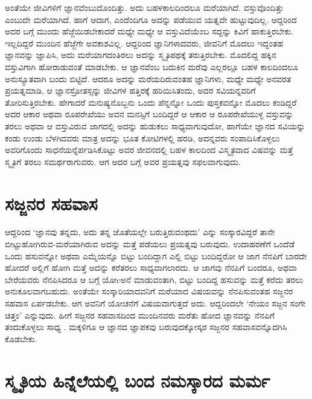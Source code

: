 ಅಂತೆಯೇ ಜೀವಿಗಳಿಗೆ ಜ್ಞಾನವೆಂಬುದೊಂದಿತ್ತು. ಅದು ಬಹಳಕಾಲದಿಂದಲೂ ಮರೆಯಾಗಿದೆ. ವಸ್ತುವೊಂದಿತ್ತು ಎಂಬುದೇ ಮರೆಯಾಗಿದೆ. ಹಾಗೆ ಆದಾಗ, ಎಂದೆಂದಿಗೂ ಅದನ್ನು ಪಡೆಯುವ ಯತ್ನವೇ ಹುಟ್ಟುವುದಿಲ್ಲ. ಆದ್ದರಿಂದ ಅದರ ಬಗ್ಗೆ ಮುಂದು ಹೆಜ್ಜೆಯಿಡಬೇಕಾದರೆ ಮಧ್ಯೇ ಮಧ್ಯೇ ಆ ವಸ್ತುವಿದೆಯೆಂಬ ಸದ್ದನ್ನು ಕಿವಿಗೆ ಹಾಕುತ್ತಿರಬೇಕು. ಇಲ್ಲದಿದ್ದರೆ ಮುಂದಿನ ಹೆಜ್ಜೆಗೇ ಅವಕಾಶವಿಲ್ಲ. ಆದ್ದರಿಂದ ಜ್ಞಾನಿಗಳಾದವರು, ಜೀವನಿಗೆ ಮೊದಲು ಇದ್ದಂತಹ ಜ್ಞಾನವನ್ನು ಜ್ಞಾಪಿಸಿ, ಅದು ಮರೆಯಾಗದಂತಿರಲು ಅದನ್ನು ಸ್ಮೃತಿಪಥಕ್ಕೆ ತರುತ್ತಿರಬೇಕು. ಮೊದಲಿದ್ದ ಹಕ್ಕಿನ ವಸ್ತುವಿಗಾಗಿ ಹೋರಾಡುವಂತೆ ಮಾಡಬೇಕು. ಆ ಜ್ಞಾನವೆಂಬ ಬದುಕಿನ ಮರೆವು ಎಲ್ಲರಲ್ಲೂ ಬಹಳ ಕಾಲದಿಂದಲೂ ಅನುಸ್ಯೂತವಾಗಿ ಬಂದು ಬಿಟ್ಟಿದೆ. ಆದರೂ ಅದನ್ನು ಮರೆಯದಿರುವಂತಹ ಜ್ಞಾನಿಗಳು, ಮಧ್ಯೇ ಮಧ್ಯೇ ಅನವರತ ಪ್ರಯತ್ನಮಾಡಿ, ಆ ಜ್ಞಾನಸ್ರೋತಸ್ಸನ್ನು ಜೀವಿಗಳ ಹತ್ತಿರಕ್ಕೆ ಹರಿಯಿಸಿತಂದು, ಅದರ ಸವಿಯನ್ನವರಿಗೆ ತೋರಿಸುತ್ತಿರಬೇಕು. ಹೇಗಾದರೆ ಮನುಷ್ಯನೊಬ್ಬನು ಒಂದು ಪೆನ್ನನ್ನೋ ಒಂದು ಪುಸ್ತಕವನ್ನೋ ಮೊದಲು ಕಂಡಿದ್ದರೆ ಅದರ ಆಕಾರ ಅಥವಾ ರೂಪರೇಖೆಯು ಅವನ ಮನಸ್ಸಿಗೆ ಬಂದಿದ್ದರೆ ಆ ಆಕಾರ ಆ ರೂಪರೇಖೆಯುಳ್ಳ ವಸ್ತುವನ್ನು ತರಲು ಅಥವಾ ಆ ವಸ್ತುವಿರುವ ಜಾಗದಲ್ಲಿ ಅದನ್ನು ಹುಡುಕಲು ಸಾಧ್ಯವಾಗುವುದೋ, ಹಾಗೆಯೇ ಜ್ಞಾನದ ಸವಿಯನ್ನು ಕಂಡು ಉಂಡು ಬೆಳಗಿದವರು ಮಾತ್ರ ಅದನ್ನು ಭೂತ ಕೋಟಿಗಳಲ್ಲಿ ಹರಡಿ, ಅದನ್ನವರು ಸಂಪಾದಿಸಿಕೊಳ್ಳಲು ಅವರಿಗೊಂದು ಸಾಧನೆಯನ್ನೆರ್ಪಡಿಸಿಕೊಟ್ಟು ಅವರ ಜೀವನದಲ್ಲಿ ಬಹಳ ಕಾಲದಿಂದ ವಿಸ್ಮೃತವಾದ ವಿಷವನ್ನು ಮತ್ತೆ ಸ್ಮೃತಿಗೆ ತರಲು ಸಮರ್ಥರಾಗುವರು. ಆಗ ಅದರ ಬಗ್ಗೆ ಅವರ ಪ್ರಯತ್ನವು ಸಫಲವಾಗುವುದು.

\section*{ಸಜ್ಜನರ ಸಹವಾಸ}
  
ಆದ್ದರಿಂದ `ಜ್ಞಾನವು ತನ್ನದು, ಅದು ತನ್ನ ಜೊತೆಯಲ್ಲೇ ಬರುತ್ತಿರುವಂಥದು' ಎನ್ನು ಸಂಸ್ಕಾರವಿದ್ದರೆ ತಾನೇ ಬೀಟ್ಟುಹೋಗಿರುವ-ಮರೆಯಾಗಿರುವ ಅದನ್ನು ಮತ್ತೆ ಪಡೆಯಲು ಪ್ರಯತ್ನವು ಬರುವುದು. ಉದಾಹರಣೆಗೆ ಒಂದೆಡೆ ಒಂದು ಹಸುವನ್ನೋ ಅಥವಾ ಎಮ್ಮೆಯನ್ನೊ ಬಿಟ್ಟು ಬಂದಿದ್ದಾಗ ಎಲ್ಲಿ ಬಿಟ್ಟು ಬಂದಿದ್ದರೋ ಆ ಜಾಗ ನೆನಪಿಗೆ ಬಾರದೇ ಹೋದರೆ ಅಲ್ಲಿಗೆ ಹೋಗಿ ಮತ್ತೆ ಅದನ್ನು ಕರೆತರಲು ಸಾಧ್ಯವಾಗಲಾರದು. ಆ ಜಾಗವು ನೆನಪಿಗೆ ಬಂದರೂ, ಅಥವಾ ಬೇರೆಯವರು ನೆನಪಿಸಿದರೂ ಆ ಬಗ್ಗೆ ಯೋcಅನೆ ಮಾಡುವಂತಾಗಿ, ಬಿಟ್ಟು ಬಂದಿದ್ದ ಹಸುವನ್ನು ಮತ್ತೆ ಕರೆದು ತರಲು ಅನುಕೂಲವಾಗಬಹುದು. ಅಂತೆಯೇ ಸಂಸ್ಕಾರಿಯಾದವನಿಗೆ ಮರೆಯಾದ ವಿಷಯವನ್ನು ನೆನಪಿಸುವಂತಹ ಸಜ್ಜನರ ಸಹವಾಸ ಏರ್ಪಡಬೇಕು. ಆಗ ಅವನಿಗೆ ಯೋಚನೆಗೆ ವಿಷಯವಾಗುತ್ತದೆ ಅದು. ಆದ್ದರಿಂದಲೇ `ನೇಯಂ ಸಜ್ಜನ ಸಂಗೇ ಚಿತ್ತಂ' ಎನ್ನುವುದು. ಹೀಗೆ ಸಜ್ಜನರ ಸಹವಾಸದಿಂದ ಮುಂದಿನವರು ಮರೆತು ಹೋದ ಜ್ಞಾನವನ್ನು ನೆನಪಿಗೆ ತಂದುಕೊಳ್ಳಲು ಸಾಧ್ಯ . ಮಕ್ಕಳಿಗೂ ಆ ಜ್ಞಾನದ ಜ್ಞಾಪಕವು ಬರುವುದಕ್ಕೋಸ್ಕರ ಸಜ್ಜನರ ಸಹವಾಸವನ್ನೊದಗಿಸಿ ಕೊಡಬೇಕು. 

\section*{ಸ್ಮೃತಿಯ ಹಿನ್ನೆಲೆಯಲ್ಲಿ ಬಂದ ನಮಸ್ಕಾರದ ಮರ್ಮ}

